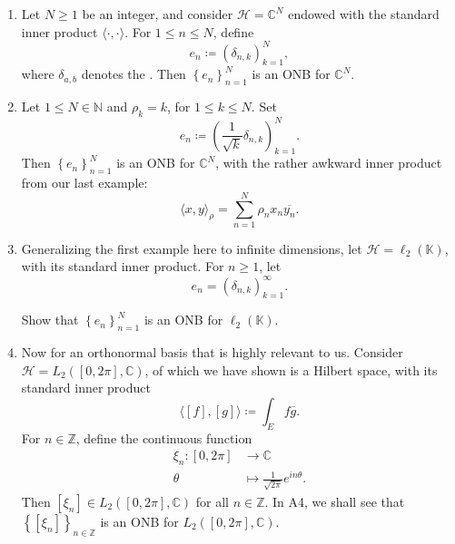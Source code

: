 \documentclass[notoc,notitlepage]{tufte-book}
\begin{document}
\begin{eg}\label{eg:examples_of_onb}
  \begin{enumerate}
    \item Let $N \geq 1$ be an integer,
      and consider $\mathcal{H} = \mathbb{C}^N$ endowed with
      the standard inner product $\langle \cdot, \cdot \rangle$.
      For $1 \leq n \leq N$, define
      \begin{equation*}
        e_n \coloneqq (\delta_{n, k})_{k=1}^{N},
      \end{equation*}
      where $\delta_{a, b}$ denotes the .
      Then $\left\{ e_n \right\}_{n=1}^{N}$ is an ONB for $\mathbb{C}^N$.

    \item Let $1 \leq N \in \mathbb{N}$ and $\rho_k = k$,
      for $1 \leq k \leq N$.
      Set
      \begin{equation*}
        e_n \coloneqq \left( \frac{1}{\sqrt{k}} \delta_{n,k} \right)_{k=1}^{N}.
      \end{equation*}
      Then $\left\{ e_n \right\}_{n=1}^{N}$ is 
      an ONB for $\mathbb{C}^N$, with the rather awkward inner product
      from our last example:
      \begin{equation*}
        \langle x, y \rangle_{\rho} = \sum_{n=1}^{N} \rho_n x_n \overline{y_n}.
      \end{equation*}

    \item \label{eg:onb_of_lill_2}
      Generalizing the first example here to infinite dimensions,
      let $\mathcal{H} = \ell_2(\mathbb{K})$, with its standard inner product.
      For $n \geq 1$, let
      \begin{equation*}
        e_n = \left( \delta_{n, k} \right)_{k=1}^{\infty}.
      \end{equation*}

      \begin{ex}
        Show that $\left\{ e_n \right\}_{n=1}^{N}$ is an ONB for
        $\ell_2(\mathbb{K})$.
      \end{ex}

    \item \label{eg:onb_of_bigl_2}
      Now for an orthonormal basis that is highly relevant to us.
      Consider $\mathcal{H} = L_2([0, 2 \pi], \mathbb{C})$,
      of which we have shown is a Hilbert space, with its standard inner product
      \begin{equation*}
        \langle [f], [g] \rangle \coloneqq \int_{E} f \overline{g}.
      \end{equation*}
      For $n \in \mathbb{Z}$, define the continuous function
      \begin{align*}
        \xi_n : [0, 2 \pi] &\to \mathbb{C} \\
                \theta &\mapsto \frac{1}{\sqrt{2 \pi}} e^{in \theta}.
      \end{align*}  
      Then $[\xi_n] \in L_2([0, 2 \pi], \mathbb{C})$ for all $n \in \mathbb{Z}$.
      In A4, we shall see that $\left\{ [\xi_n] \right\}_{n \in \mathbb{Z}}$
      is an ONB for $L_2([0, 2 \pi], \mathbb{C})$.
  \end{enumerate}
\end{eg}
\end{document}
